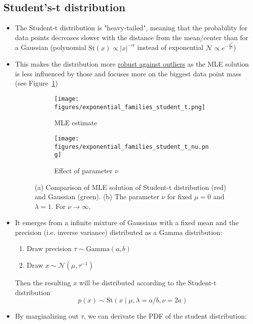 \subsection{Student's-t distribution}
\begin{itemize}
	\item The Student-t distribution is "heavy-tailed", meaning that the probability for data points decreases slower with the distance from the mean/center than for a Gaussian (polynomial $\text{St}(x)\propto |x|^{-\alpha}$ instead of exponential $\mathcal{N}\propto e^{-\frac{x^2}{\sigma^2}}$)
	\item This makes the distribution more \underline{robust against outliers} as the MLE solution is less influenced by those and focuses more on the biggest data point mass (see Figure~\ref{fig:exponential_families_student_t})
	\begin{figure}[ht!]
		\centering
		\begin{subfigure}{0.25\textwidth}
			\centering
			\texttt{[image: figures/exponential\_families\_student\_t.png]}
			\caption{MLE estimate}
			\label{fig:exponential_families_student_t}
		\end{subfigure}
		\hspace{10mm}
		\begin{subfigure}{0.3\textwidth}
			\centering
			\texttt{[image: figures/exponential\_families\_student\_t\_nu.png]}
			\caption{Effect of parameter $\nu$}
			\label{fig:exponential_families_student_t_nu}
		\end{subfigure}
		\caption{(a) Comparison of MLE solution of Student-t distribution (red) and Gaussian (green). (b) The parameter $\nu$ for fixed $\mu=0$ and $\lambda=1$. For $\nu\to\infty$, }
	\end{figure}
	\item It emerges from a infinite mixture of Gaussians with a fixed mean and the precision (i.e. inverse variance) distributed as a Gamma distribution:
	\begin{enumerate}
		\item Draw precision $\tau \sim \text{Gamma}(a,b)$
		\item Draw $x\sim \mathcal{N}(\mu, \tau^{-1})$
	\end{enumerate}
	Then the resulting $x$ will be distributed according to the Student-t distribution
	$$p(x) \sim \text{St}(x\mid \mu, \lambda=a/b, \nu=2a)$$
	\item By marginalizing out $\tau$, we can derivate the PDF of the student distribution:
	\begin{equation*}

\end{equation*}
\end{itemize}

